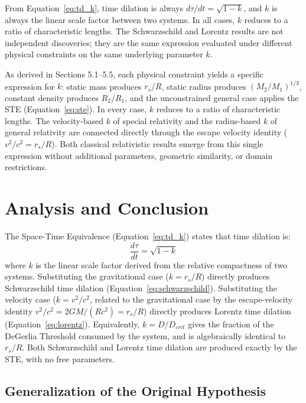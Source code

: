 \documentclass[twoside,twocolumn,9pt]{article}
\begin{document}
From Equation~\ref{eq:td_k}, time dilation is always $d\tau/dt = \sqrt{1-k}$, and $k$ is always the linear scale factor between two systems. In all cases, $k$ reduces to a ratio of characteristic lengths. The Schwarzschild and Lorentz results are not independent discoveries; they are the same expression evaluated under different physical constraints on the same underlying parameter $k$.

As derived in Sections 5.1--5.5, each physical constraint yields a specific expression for $k$: static mass produces $r_s/R$, static radius produces $(M_2/M_1)^{1/3}$, constant density produces $R_2/R_1$, and the unconstrained general case applies the STE (Equation~\ref{eq:ste}). In every case, $k$ reduces to a ratio of characteristic lengths. The velocity-based $k$ of special relativity and the radius-based $k$ of general relativity are connected directly through the escape velocity identity ($v^2/c^2 = r_s/R$). Both classical relativistic results emerge from this single expression without additional parameters, geometric similarity, or domain restrictions.

\section{Analysis and Conclusion}\label{sec:conclusion}

The Space-Time Equivalence (Equation~\ref{eq:td_k}) states that time dilation is:
\[
\frac{d\tau}{dt} = \sqrt{1 - k}
\]
where $k$ is the linear scale factor derived from the relative compactness of two systems. Substituting the gravitational case ($k = r_s/R$) directly produces Schwarzschild time dilation (Equation~\ref{eq:schwarzschild}). Substituting the velocity case ($k = v^2/c^2$, related to the gravitational case by the escape-velocity identity $v^2/c^2 = 2GM/(Rc^2) = r_s/R$) directly produces Lorentz time dilation (Equation~\ref{eq:lorentz}). Equivalently, $k = D/D_{crit}$ gives the fraction of the DeGerlia Threshold consumed by the system, and is algebraically identical to $r_s/R$. Both Schwarzschild and Lorentz time dilation are produced exactly by the STE, with no free parameters.

\subsection{Generalization of the Original Hypothesis}
\end{document}
